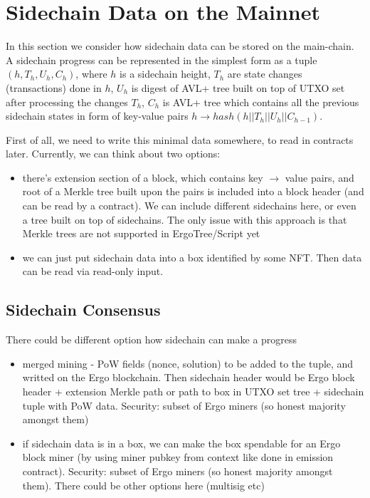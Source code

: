 \documentclass{article}   %
\begin{document}
\section{Sidechain Data on the Mainnet}

In this section we consider how sidechain data can be stored on the main-chain. A sidechain progress can be represented in the simplest form as a tuple $(h, T_h, U_h, C_{h})$, where
$h$ is a sidechain height, $T_h$ are state changes (transactions) done in $h$, $U_h$ is digest of AVL+ tree built on top
of UTXO set after processing the changes $T_h$, $C_{h}$ is AVL+ tree which contains all the previous sidechain states in form
of key-value pairs $h \rightarrow hash(h || T_h || U_h || C_{h-1})$.

First of all, we need to write this minimal data somewhere, to read in contracts later. Currently, we can think about two options:

\begin{itemize}
\item{} there's extension section of a block, which contains key $\rightarrow$ value pairs, and root of a Merkle tree built upon the pairs is included into a
block header (and can be read by a contract). We can include different sidechains here, or even a tree built on top of sidechains. The only issue with this approach is that Merkle trees are not supported in ErgoTree/Script yet

\item{} we can just put sidechain data into a box identified by some NFT. Then data can be read via read-only input.
\end{itemize}

\subsection{Sidechain Consensus}


There could be different option how sidechain can make a progress
\begin{itemize}
\item{} merged mining - PoW fields (nonce, solution) to be added to the tuple, and writted on the Ergo blockchain. Then sidechain header would be Ergo block header + extension Merkle path or path to box in UTXO set tree + sidechain tuple with PoW data. Security: subset of Ergo miners (so honest majority amongst them)

\item{} if sidechain data is in a box, we can make the box spendable for an Ergo block miner (by using miner pubkey from context like done in emission contract). Security: subset of Ergo miners (so honest majority amongst them). There could be other options here (multisig etc)
\end{itemize}
\end{document}

